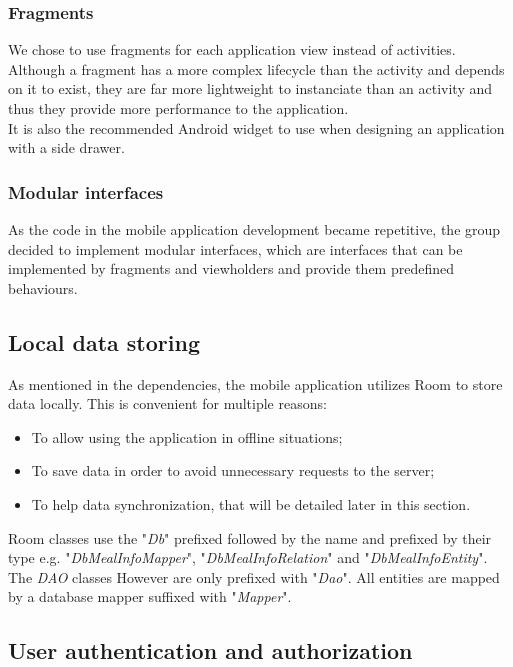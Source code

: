 \subsubsection{Fragments}

We chose to use fragments\cite{fragment} for each application view instead of activities. Although a fragment has a more complex lifecycle than the activity and depends on it
to exist, they are far more lightweight to instanciate than an activity and thus they provide more performance to the application.\\ 

It is also the recommended Android widget to use when designing an application with a side drawer.\\

\subsubsection{Modular interfaces}

As the code in the mobile application development became repetitive, the group decided to implement modular interfaces,
which are interfaces that can be implemented by fragments and viewholders and provide them predefined behaviours.

\subsection{Local data storing}

As mentioned in the dependencies, the mobile application utilizes Room to store data locally. This is convenient
for multiple reasons: 
\begin{itemize}
    \item To allow using the application in offline situations;
    \item To save data in order to avoid unnecessary requests to the server;
    \item To help data synchronization, that will be detailed later in this section.
\end{itemize}

Room classes use the "\textit{Db}" prefixed followed by the name and prefixed by their type e.g. "\textit{DbMealInfoMapper}", "\textit{DbMealInfoRelation}" and "\textit{DbMealInfoEntity}". 
The \textit{DAO} classes However are only prefixed with "\textit{Dao}". 
All entities are mapped by a database mapper suffixed with "\textit{Mapper}".

\subsection{User authentication and authorization}


